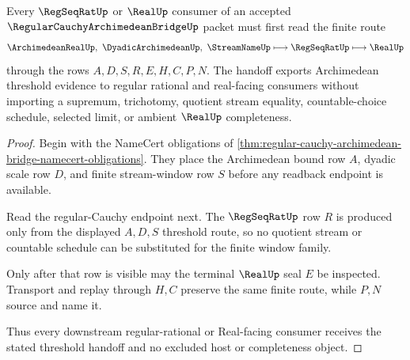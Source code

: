 \begin{theorem}
\label{thm:regular-cauchy-archimedean-bridge-threshold-handoff}
Every $\RegSeqRatUp$ or $\RealUp$ consumer of an accepted $\RegularCauchyArchimedeanBridgeUp$ packet must first read the finite route
$$
\ArchimedeanRealUp,\ \DyadicArchimedeanUp,\ \StreamNameUp \longmapsto \RegSeqRatUp \longmapsto \RealUp
$$
through the rows $A,D,S,R,E,H,C,P,N$. The handoff exports Archimedean threshold evidence to regular rational and real-facing consumers without importing a supremum, trichotomy, quotient stream equality, countable-choice schedule, selected limit, or ambient $\RealUp$ completeness.
\end{theorem}
\begin{proof}
Begin with the NameCert obligations of \autoref{thm:regular-cauchy-archimedean-bridge-namecert-obligations}. They place the Archimedean bound row $A$, dyadic scale row $D$, and finite stream-window row $S$ before any readback endpoint is available.

Read the regular-Cauchy endpoint next. The $\RegSeqRatUp$ row $R$ is produced only from the displayed $A,D,S$ threshold route, so no quotient stream or countable schedule can be substituted for the finite window family.

Only after that row is visible may the terminal $\RealUp$ seal $E$ be inspected. Transport and replay through $H,C$ preserve the same finite route, while $P,N$ source and name it.

Thus every downstream regular-rational or Real-facing consumer receives the stated threshold handoff and no excluded host or completeness object.
\end{proof}



